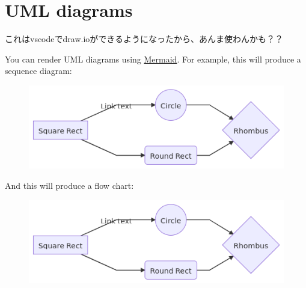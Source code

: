 \documentclass[]{article}
\begin{document}
\section{UML diagrams}\label{header-n432}

これはvscodeでdraw.ioができるようになったから、あんま使わんかも？？

You can render UML diagrams using
\href{https://mermaidjs.github.io/}{Mermaid}. For example, this will
produce a sequence diagram:

\begin{figure}
\centering
\includegraphics[width=6.93750in]{1590755747410.png}
\caption{}\label{mermaid}
\end{figure}

And this will produce a flow chart:

\begin{figure}
\centering
\includegraphics[width=5.16667in]{1590755747410.png}
\caption{}\label{mermaid}
\end{figure}
\end{document}

